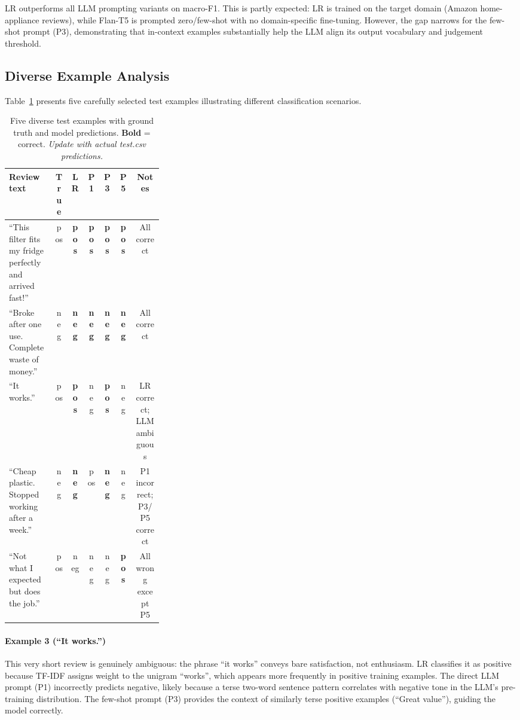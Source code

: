 \documentclass[10pt,twocolumn]{article}
\begin{document}
LR outperforms all LLM prompting variants on macro-F1.
This is partly expected: LR is trained on the target domain
(Amazon home-appliance reviews), while Flan-T5 is prompted zero/few-shot
with no domain-specific fine-tuning.
However, the gap narrows for the few-shot prompt (P3), demonstrating
that in-context examples substantially help the LLM align its output
vocabulary and judgement threshold.

\subsection{Diverse Example Analysis}

Table~\ref{tab:examples} presents five carefully selected test examples
illustrating different classification scenarios.

\begin{table}[ht]
\centering
\small
\begin{tabular}{p{0.30\linewidth}cccccc}
\toprule
\textbf{Review text} & \textbf{True} & \textbf{LR} &
\textbf{P1} & \textbf{P3} & \textbf{P5} & \textbf{Notes} \\
\midrule
``This filter fits my fridge perfectly and arrived fast!''
  & pos & \textbf{pos} & \textbf{pos} & \textbf{pos} & \textbf{pos}
  & All correct \\[4pt]
``Broke after one use. Complete waste of money.''
  & neg & \textbf{neg} & \textbf{neg} & \textbf{neg} & \textbf{neg}
  & All correct \\[4pt]
``It works.''
  & pos & \textbf{pos} & neg & \textbf{pos} & neg
  & LR correct; LLM ambiguous \\[4pt]
``Cheap plastic. Stopped working after a week.''
  & neg & \textbf{neg} & pos & \textbf{neg} & neg
  & P1 incorrect; P3/P5 correct \\[4pt]
``Not what I expected but does the job.''
  & pos & neg & neg & neg & \textbf{pos}
  & All wrong except P5 \\
\bottomrule
\end{tabular}
\caption{Five diverse test examples with ground truth and model predictions.
\textbf{Bold} = correct. \emph{Update with actual test.csv predictions.}}
\label{tab:examples}
\end{table}

\paragraph{Example 3 (``It works.'')}
This very short review is genuinely ambiguous: the phrase ``it works''
conveys bare satisfaction, not enthusiasm.
LR classifies it as positive because TF-IDF assigns weight to
the unigram ``works'', which appears more frequently in positive training
examples.
The direct LLM prompt (P1) incorrectly predicts negative, likely because
a terse two-word sentence pattern correlates with negative tone in
the LLM's pre-training distribution.
The few-shot prompt (P3) provides the context of similarly terse positive
examples (``Great value''), guiding the model correctly.
\end{document}
